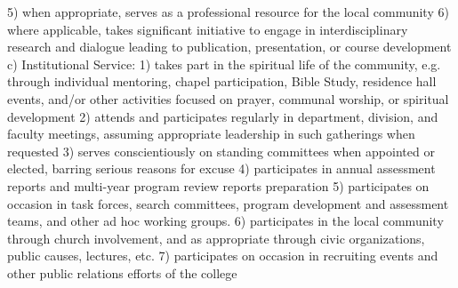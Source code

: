 \documentclass[letterpaper, 11pt]{article}
\begin{document}
	5) when appropriate, serves as a professional resource for the local community
	6) where applicable, takes significant initiative to engage in interdisciplinary research and dialogue leading to publication, presentation, or course development
	c) Institutional Service:
	1) takes part in the spiritual life of the community, e.g. through individual mentoring, chapel participation, Bible Study, residence hall events, and/or other activities focused on prayer, communal worship, or spiritual development
	2) attends and participates regularly in department, division, and faculty meetings, assuming appropriate leadership in such gatherings when requested
	3) serves conscientiously on standing committees when appointed or elected, barring serious reasons for excuse
	4) participates in annual assessment reports and multi-year program review reports preparation
	5) participates on occasion in task forces, search committees, program development and assessment teams, and other ad hoc working groups.
	6) participates in the local community through church involvement, and as appropriate through civic organizations, public causes, lectures, etc.
	7) participates on occasion in recruiting events and other public relations efforts of the college
\end{document}
